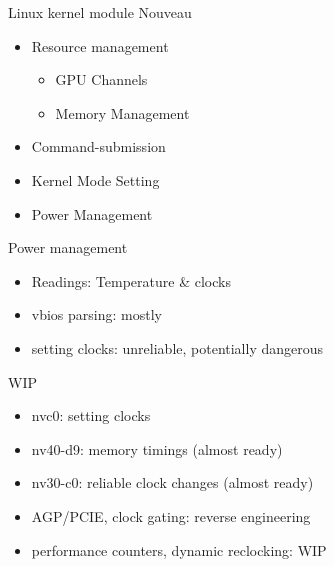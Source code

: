 \documentclass[11pt,english,compress]{beamer}
\begin{document}
		\begin{frame}
			\begin{block}{Linux kernel module Nouveau}
				\begin{itemize}
					\item Resource management
						\begin{itemize}
							\item GPU Channels
							\item Memory Management
						\end{itemize}
					\item Command-submission
					\item Kernel Mode Setting
					\item Power Management
				\end{itemize}
			\end{block}
		\end{frame}

		\begin{frame}
			\begin{block}{Power management}
 				\begin{itemize}
					\item Readings: Temperature \& clocks
					\item vbios parsing: mostly
					\item setting clocks: unreliable, potentially dangerous
				\end{itemize}
			\end{block}

			\begin{block}{WIP}
				\begin{itemize}
					\item nvc0: setting clocks
					\item nv40-d9: memory timings (almost ready)
					\item nv30-c0: reliable clock changes (almost ready)
					\item AGP/PCIE, clock gating: reverse engineering
					\item performance counters, dynamic reclocking: WIP
				\end{itemize}
			\end{block}
		\end{frame}
\end{document}

